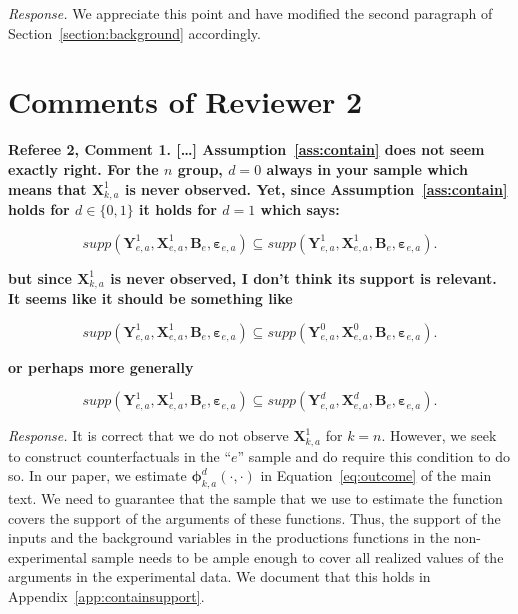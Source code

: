 \noindent \textit{Response.} We appreciate this point and have modified the second paragraph of Section~\ref{section:background} accordingly.

\section*{Comments of Reviewer 2}

\noindent \textbf{Referee 2, Comment 1. [\ldots] Assumption~\ref{ass:contain} does not seem exactly right. For the $n$ group, $d = 0$ always in your sample which means that $\bm{X}_{k,a}^1$ is never observed. Yet, since Assumption~\ref{ass:contain} holds for $d \in \{ 0,1 \}$ it holds for $d = 1$ which says:} 

\begin{equation}
supp( \bm{Y}_{e,a}^1, \bm{X}^1_{e,a}, \bm{B}_e, \bm{\varepsilon}_{e,a} ) \subseteq supp( \bm{Y}_{e,a}^1, \bm{X}^1_{e,a}, \bm{B}_e, \bm{\varepsilon}_{e,a} ). \label{eq:ref1}
\end{equation}

\textbf{but since $\bm{X}_{k,a}^1$ is never observed, I don't think its support is relevant. It seems like it should be something like} 

\begin{equation}
supp( \bm{Y}_{e,a}^1, \bm{X}^1_{e,a}, \bm{B}_e, \bm{\varepsilon}_{e,a} ) \subseteq supp( \bm{Y}_{e,a}^0, \bm{X}^0_{e,a}, \bm{B}_e, \bm{\varepsilon}_{e,a} ).  \label{eq:ref2}
\end{equation}

\textbf{or perhaps more generally}

\begin{equation}
supp( \bm{Y}_{e,a}^1, \bm{X}^1_{e,a}, \bm{B}_e, \bm{\varepsilon}_{e,a} ) \subseteq supp( \bm{Y}_{e,a}^d, \bm{X}^d_{e,a}, \bm{B}_e, \bm{\varepsilon}_{e,a} ).  \label{eq:ref3}
\end{equation}

\noindent \textit{Response.} It is correct that we do not observe $\bm{X}_{k,a}^1$ for $k = n$. However, we seek to construct counterfactuals in the ``$e$'' sample and do require this condition to do so. In our paper, we estimate $\bm{\phi}_{k,a}^d \left( \cdot, \cdot \right)$ in Equation~\eqref{eq:outcome} of the main text. We need to guarantee that the sample that we use to estimate the function covers the support of the arguments of these functions. Thus, the support of the inputs and the background variables in the productions functions in the non-experimental sample needs to be ample enough to cover all realized values of the arguments in the experimental data. We document that this holds in Appendix~\ref{app:containsupport}. 

